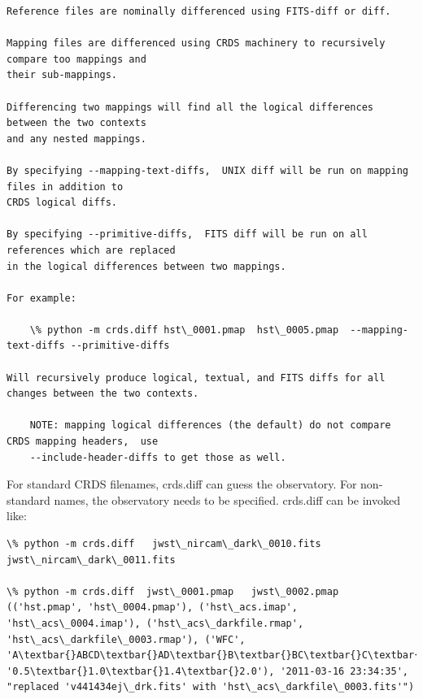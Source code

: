 \documentclass[letterpaper,10pt,english]{sphinxmanual}
\begin{document}
\begin{Verbatim}[commandchars=\\\{\}]
Reference files are nominally differenced using FITS-diff or diff.

Mapping files are differenced using CRDS machinery to recursively compare too mappings and
their sub-mappings.

Differencing two mappings will find all the logical differences between the two contexts
and any nested mappings.

By specifying --mapping-text-diffs,  UNIX diff will be run on mapping files in addition to
CRDS logical diffs.

By specifying --primitive-diffs,  FITS diff will be run on all references which are replaced
in the logical differences between two mappings.

For example:

    \% python -m crds.diff hst\_0001.pmap  hst\_0005.pmap  --mapping-text-diffs --primitive-diffs

Will recursively produce logical, textual, and FITS diffs for all changes between the two contexts.

    NOTE: mapping logical differences (the default) do not compare CRDS mapping headers,  use
    --include-header-diffs to get those as well.
\end{Verbatim}

For standard CRDS filenames,  crds.diff can guess the observatory.   For
non-standard names,  the observatory needs to be specified.  crds.diff can be
invoked like:

\begin{Verbatim}[commandchars=\\\{\}]
\% python -m crds.diff   jwst\_nircam\_dark\_0010.fits  jwst\_nircam\_dark\_0011.fits

\% python -m crds.diff  jwst\_0001.pmap   jwst\_0002.pmap
(('hst.pmap', 'hst\_0004.pmap'), ('hst\_acs.imap', 'hst\_acs\_0004.imap'), ('hst\_acs\_darkfile.rmap', 'hst\_acs\_darkfile\_0003.rmap'), ('WFC', 'A\textbar{}ABCD\textbar{}AD\textbar{}B\textbar{}BC\textbar{}C\textbar{}D', '0.5\textbar{}1.0\textbar{}1.4\textbar{}2.0'), '2011-03-16 23:34:35', "replaced 'v441434ej\_drk.fits' with 'hst\_acs\_darkfile\_0003.fits'")
\end{Verbatim}
\end{document}
